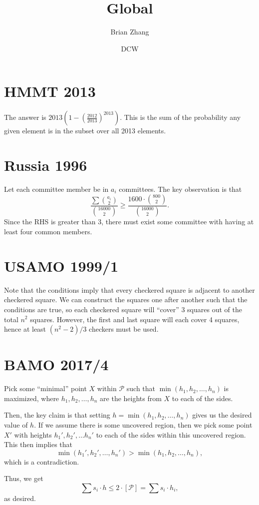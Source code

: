 \documentclass[11pt]{scrartcl}
\title{Global}
\author{Brian Zhang}
\date{DCW}
\begin{document}
\maketitle

\section{HMMT 2013}
The answer is $2013 \left (1 - \left (\frac{2012}{2013} \right) ^ {2013} \right)$. This is the sum of the probability any given element is in the subset over all 2013 elements.

\section{Russia 1996}
Let each committee member be in $a_i$ committees. The key observation is that 
\[\frac{\sum \binom{a_i}{2}}{\binom{16000}{2}} \geq \frac{1600 \cdot \binom{800}{2}}{\binom{16000}{2}}.\]
Since the RHS is greater than 3, there must exist some committee with having at least four common members.

\section{USAMO 1999/1}
Note that the conditions imply that every checkered square is adjacent to another checkered square. We can construct the squares one after another such that the conditions are true, so each checkered square will ``cover'' 3 squares out of the total $n^2$ squares. However, the first and last square will each cover 4 squares, hence at least $(n^2-2)/3$ checkers must be used.

\section{BAMO 2017/4}
Pick some ``minimal'' point $X$ within $\mathcal{P}$ such that $\min(h_1, h_2, \dots, h_n)$ is maximized, where $h_1, h_2, \dots, h_n$ are the heights from $X$ to each of the sides. 

Then, the key claim is that setting $h=\min(h_1, h_2, \dots, h_n)$ gives us the desired value of $h$. If we assume there is some uncovered region, then we pick some point $X'$ with heights $h_1', h_2', \dots h_n'$ to each of the sides within this uncovered region. This then implies that \[\min(h_1', h_2', \dots, h_n') > \min(h_1, h_2, \dots, h_n),\] which is a contradiction. 

Thus, we get \[\sum s_i \cdot h \leq 2 \cdot [\mathcal{P}] = \sum s_i \cdot h_i,\] as desired. 
\end{document}
